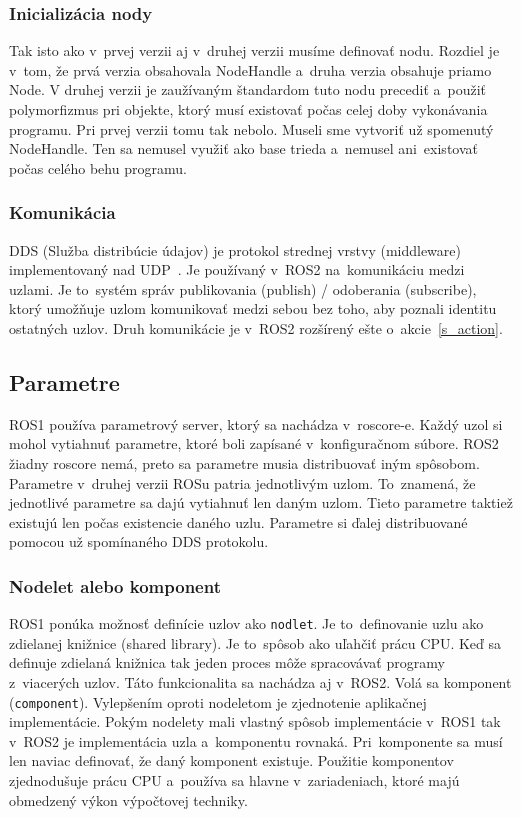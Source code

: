 \subsubsection{Inicializácia nody}

	Tak isto ako v~prvej verzii aj v~druhej verzii musíme definovať nodu. Rozdiel je v~tom, že prvá verzia obsahovala NodeHandle a~druha verzia obsahuje priamo Node.
	V druhej verzii je zaužívaným štandardom tuto nodu precediť a~použiť polymorfizmus pri objekte, ktorý musí existovať počas celej doby vykonávania programu. Pri
	prvej verzii tomu tak nebolo. Museli sme vytvoriť už spomenutý NodeHandle. Ten sa nemusel využiť ako base trieda a~nemusel ani~existovať počas celého behu programu.

\newpage
\subsubsection{Komunikácia}

	DDS (Služba distribúcie údajov) je protokol strednej vrstvy (middleware) implementovaný nad UDP~\cite{ROS2book}. Je používaný v~ROS2 na~komunikáciu
	medzi uzlami. Je to~systém správ publikovania (publish) / odoberania (subscribe), ktorý umožňuje uzlom komunikovať medzi sebou bez toho,
	aby poznali identitu ostatných uzlov. Druh komunikácie je v~ROS2 rozšírený ešte o~akcie~\ref{s_action}.

\subsection{Parametre}

	ROS1 používa parametrový server, ktorý sa nachádza v~roscore-e. Každý uzol si mohol vytiahnuť parametre, ktoré boli zapísané v~konfiguračnom súbore.
	ROS2 žiadny roscore nemá, preto sa parametre musia distribuovať iným spôsobom. Parametre v~druhej verzii ROSu patria jednotlivým uzlom. To~znamená, že jednotlivé
	parametre sa dajú vytiahnuť len daným uzlom. Tieto parametre taktiež existujú len počas existencie daného uzlu. Parametre si ďalej distribuované pomocou už spomínaného
	DDS protokolu.

\subsubsection{Nodelet alebo komponent}

	ROS1 ponúka možnosť definície uzlov ako \texttt{nodlet}. Je to~definovanie uzlu ako zdielanej knižnice (shared library). Je to~spôsob ako uľahčiť
	prácu CPU. Keď sa definuje zdielaná knižnica tak jeden proces môže spracovávať programy z~viacerých uzlov. Táto funkcionalita sa nachádza aj v~ROS2.
	Volá sa komponent (\texttt{component}). Vylepšením oproti nodeletom je zjednotenie aplikačnej implementácie. Pokým nodelety mali vlastný spôsob
	implementácie v~ROS1 tak v~ROS2 je implementácia uzla a~komponentu rovnaká. Pri~komponente sa musí len naviac definovať, že daný komponent existuje.
	Použitie komponentov zjednodušuje prácu CPU a~používa sa hlavne v~zariadeniach, ktoré majú obmedzený výkon výpočtovej techniky.

